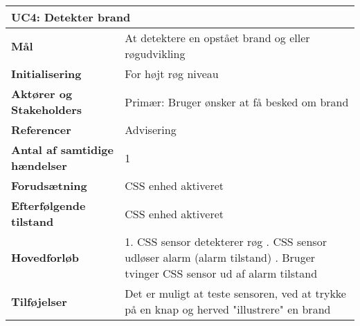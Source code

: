 \begin{table}[H] \centering
\begin{tabular}{|p{6cm}|p{8cm}|}
	\hline
\multicolumn{2}{|l|}{\textbf{UC4: Detekter brand}} \\\hline
\textbf{Mål}								&At detektere en opstået brand og eller røgudvikling \\\hline
\textbf{Initialisering}					&For højt røg niveau\\\hline
\textbf{Aktører og Stakeholders}			&Primær: Bruger ønsker at få besked om brand \\\hline
\textbf{Referencer}						&Advisering \\\hline
\textbf{Antal af samtidige hændelser}	&1 \\\hline
\textbf{Forudsætning}					&CSS enhed aktiveret  \\\hline
\textbf{Efterfølgende tilstand}			&CSS enhed aktiveret \\\hline
\textbf{Hovedforløb}						&   
1. CSS sensor detekterer røg \newline 
2. CSS sensor udløser alarm (alarm tilstand) \newline 
3. Bruger tvinger CSS sensor ud af alarm tilstand\\\hline
\textbf{Tilføjelser}						&Det er muligt at teste sensoren, ved at trykke på en knap og herved "illustrere" en brand  \\\hline
	\end{tabular}
	\label{UC4} 
\end{table}